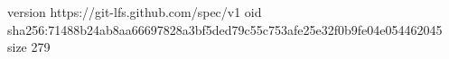 version https://git-lfs.github.com/spec/v1
oid sha256:71488b24ab8aa66697828a3bf5ded79c55c753afe25e32f0b9fe04e054462045
size 279
